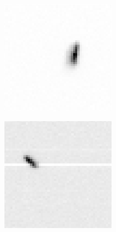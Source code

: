 \begin{figure}[!h]
\begin{subfigure}[t]{.23\textwidth}
        \caption{}
    \end{subfigure}
    \begin{subfigure}[t]{.23\textwidth}
        \centering
        \includegraphics[width=\textwidth]{images/wrongImage34.png}
        \caption{}
    \end{subfigure}
    \begin{subfigure}[t]{.23\textwidth}
        \centering
        \includegraphics[width=\textwidth]{images/wrongImage48.png}
        \caption{}
        \label{fig:streakpointmis3}
    \end{subfigure}


\end{figure}
